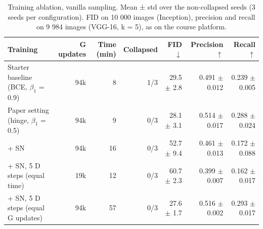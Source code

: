 \begin{table}[t]
\centering\small
\begin{tabular}{lrrrrrr}
\toprule
Training & G updates & Time (min) & Collapsed & FID $\downarrow$ & Precision $\uparrow$ & Recall $\uparrow$ \\
\midrule
Starter baseline (BCE, $\beta_1$ = 0.9) & 94k & 8 & 1/3 & 29.5 $\pm$ 2.8 & 0.491 $\pm$ 0.012 & 0.239 $\pm$ 0.005 \\
Paper setting (hinge, $\beta_1$ = 0.5) & 94k & 9 & 0/3 & 28.1 $\pm$ 3.1 & 0.514 $\pm$ 0.017 & 0.288 $\pm$ 0.024 \\
+ SN & 94k & 16 & 0/3 & 52.7 $\pm$ 9.4 & 0.461 $\pm$ 0.013 & 0.172 $\pm$ 0.088 \\
+ SN, 5 D steps (equal time) & 19k & 12 & 0/3 & 60.7 $\pm$ 2.3 & 0.399 $\pm$ 0.007 & 0.162 $\pm$ 0.017 \\
+ SN, 5 D steps (equal G updates) & 94k & 57 & 0/3 & 27.6 $\pm$ 1.7 & 0.516 $\pm$ 0.002 & 0.293 $\pm$ 0.017 \\
\bottomrule
\end{tabular}
\caption{Training ablation, vanilla sampling. Mean ± std over the non-collapsed seeds (3 seeds per configuration). FID on 10 000 images (Inception), precision and recall on 9 984 images (VGG-16, k = 5), as on the course platform.}
\end{table}
